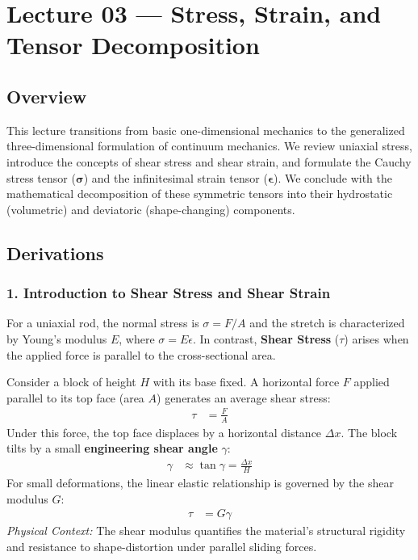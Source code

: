 \section{Lecture 03 — Stress, Strain, and Tensor Decomposition}
\label{sec:lec03:stress_strain}

\subsection*{Overview}
This lecture transitions from basic one-dimensional mechanics to the generalized three-dimensional formulation of continuum mechanics. We review uniaxial stress, introduce the concepts of shear stress and shear strain, and formulate the Cauchy stress tensor ($\mathbf{\sigma}$) and the infinitesimal strain tensor ($\mathbf{\epsilon}$). We conclude with the mathematical decomposition of these symmetric tensors into their hydrostatic (volumetric) and deviatoric (shape-changing) components. 

\subsection*{Derivations}

\subsubsection*{1. Introduction to Shear Stress and Shear Strain}
For a uniaxial rod, the normal stress is $\sigma = F/A$ and the stretch is characterized by Young's modulus $E$, where $\sigma = E \epsilon$. In contrast, \textbf{Shear Stress} ($\tau$) arises when the applied force is parallel to the cross-sectional area. 

Consider a block of height $H$ with its base fixed. A horizontal force $F$ applied parallel to its top face (area $A$) generates an average shear stress:
\begin{align}
    \tau &= \frac{F}{A}
\end{align}
Under this force, the top face displaces by a horizontal distance $\Delta x$. The block tilts by a small \textbf{engineering shear angle} $\gamma$:
\begin{align}
    \gamma &\approx \tan \gamma = \frac{\Delta x}{H}
\end{align}
For small deformations, the linear elastic relationship is governed by the shear modulus $G$:
\begin{align}
    \tau &= G \gamma
\end{align}
\textit{Physical Context:} The shear modulus quantifies the material's structural rigidity and resistance to shape-distortion under parallel sliding forces.

